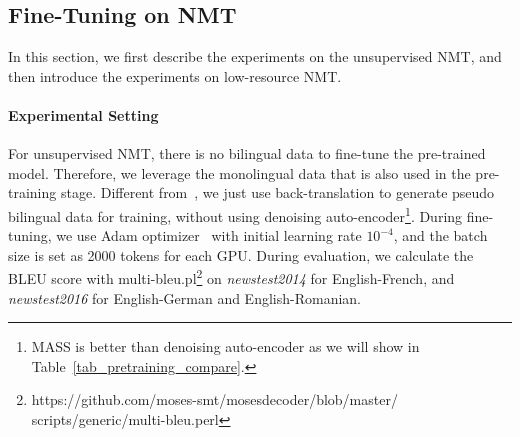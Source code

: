 \documentclass{article}
\begin{document}
	
	\subsection{Fine-Tuning on NMT} 
	\label{sec_finetune_nmt}
	In this section, we first describe the experiments on the unsupervised NMT, and then introduce the experiments on low-resource NMT.
	
	\paragraph{Experimental Setting} For unsupervised NMT, there is no bilingual data to fine-tune the pre-trained model. Therefore, we leverage the monolingual data that is also used in the pre-training stage. Different from~\citet{artetxe2017unsupervised,lample2017unsupervised,DBLP:conf/emnlp/LampleOCDR18,leng2019unsupervised}, we just use back-translation to generate pseudo bilingual data for training, without using denoising auto-encoder\footnote{MASS is better than denoising auto-encoder as we will show in Table~\ref{tab_pretraining_compare}.}. During fine-tuning, we use Adam optimizer~\cite{kingma2015adam} with initial learning rate $10^{-4}$, and the batch size is set as 2000 tokens for each GPU. During evaluation, we calculate the BLEU score with multi-bleu.pl\footnote{https://github.com/moses-smt/mosesdecoder/blob/master/ scripts/generic/multi-bleu.perl} on \emph{newstest2014} for English-French, and \emph{newstest2016} for English-German and English-Romanian.
\iffalse
\end{document}
